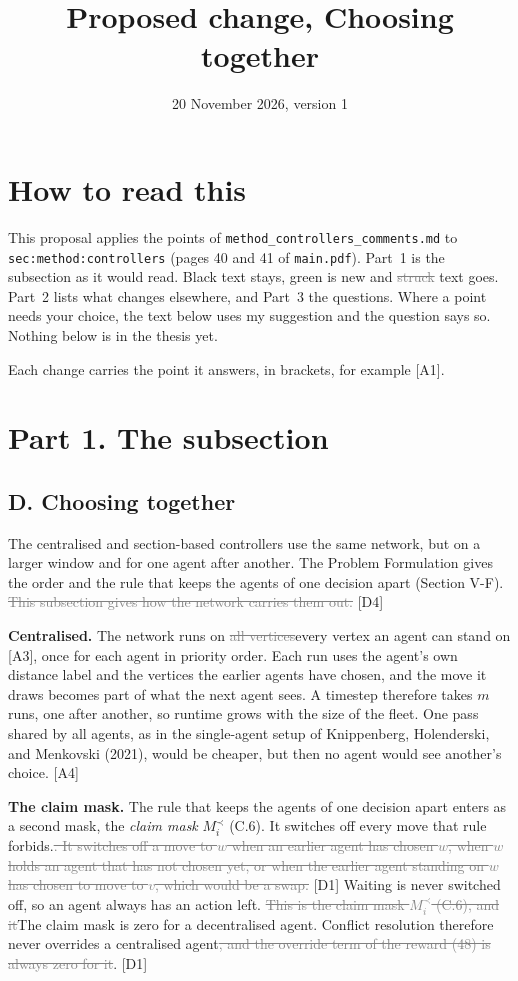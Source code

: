 \documentclass[11pt,a4paper]{article}
\title{Proposed change, Choosing together}
\date{20 November 2026, version 1}
\newcommand{\new}[1]{\textcolor{newc}{#1}}
\newcommand{\old}[1]{\textcolor{gray}{\sout{#1}}}
\begin{document}
\sloppy
\maketitle

\section*{How to read this}
This proposal applies the points of \texttt{method\_controllers\_comments.md}
to \texttt{sec:method:controllers} (pages 40 and 41 of \texttt{main.pdf}).
Part~1 is the subsection as it would read. Black text stays, \new{green} is
new and \old{struck} text goes. Part~2 lists what changes elsewhere, and
Part~3 the questions. Where a point needs your choice, the text below uses my
suggestion and the question says so. Nothing below is in the thesis yet.

Each change carries the point it answers, in brackets, for example [A1].

\section*{Part 1. The subsection}

\subsection*{D. Choosing together}

The centralised and section-based controllers use the same network, but on a
larger window and for one agent after another. The Problem Formulation gives
the order and the rule that keeps the agents of one decision apart
(Section V-F). \old{This subsection gives how the network carries them
out.} [D4]

\textbf{Centralised.} The network runs on \old{all vertices}\new{every
vertex an agent can stand on} [A3], once for each agent in priority order.
Each run uses the agent's own distance label and the vertices the earlier
agents have chosen, and the move it draws becomes part of what the next
agent sees. A timestep therefore takes $m$ runs, one after another, so
runtime grows with the size of the fleet. One pass shared by all agents, as
in \new{the single-agent setup of} Knippenberg, Holenderski, and Menkovski
(2021), would be cheaper, but then no agent would see another's choice. [A4]

\textbf{The claim mask.} The rule that keeps the agents of one decision
apart enters as a second mask\new{, the \emph{claim mask} $M^{\prec}_i$
(C.6). It switches off every move that rule forbids.}\old{. It switches off
a move to $w$ when an earlier agent has chosen $w$, when $w$ holds an agent
that has not chosen yet, or when the earlier agent standing on $w$ has
chosen to move to $v$, which would be a swap.} [D1] Waiting is never
switched off, so an agent always has an action left. \old{This is the claim
mask $M^{\prec}_i$ (C.6), and it}\new{The claim mask} is zero for a
decentralised agent. Conflict resolution therefore never overrides a
centralised agent\old{, and the override term of the reward (48) is always
zero for it}. [D1]
\end{document}
